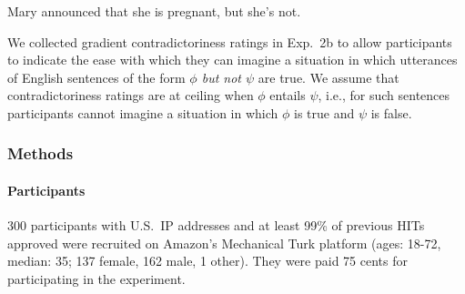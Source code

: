 \documentclass[11pt,fleqn]{article}
\newcommand{\6}{\mbox{$[\hspace*{-.6mm}[$}}
\newcommand{\9}{\mbox{$]\hspace*{-.6mm}]$}}
\begin{document}
\begin{exe}
\ex\label{announce3} Mary announced that she is pregnant, but she's not.
\end{exe}
We collected gradient contradictoriness ratings in Exp.~2b to allow participants to indicate the ease with which they can imagine a situation in which utterances of English sentences of the form {\em $\phi$ but not $\psi$}  are true. We assume that contradictoriness ratings are at ceiling when $\phi$ entails $\psi$, i.e., for such sentences participants cannot imagine a situation in which $\phi$ is true and $\psi$ is false. 

\subsubsection{Methods}

\paragraph{Participants} 300 participants with U.S.\ IP addresses and at least 99\% of previous HITs approved were recruited on Amazon's Mechanical Turk platform (ages: 18-72, median: 35; 137 female, 162 male, 1 other). They were paid 75 cents for participating in the experiment.
\end{document}
